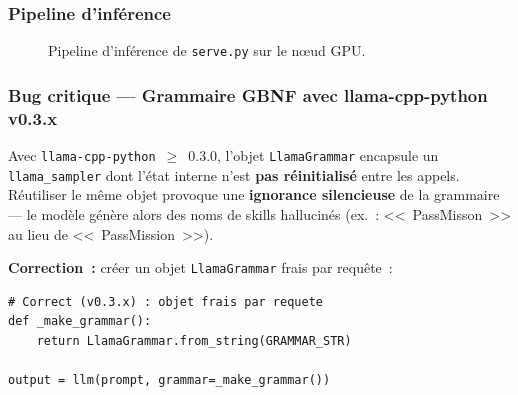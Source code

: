 \documentclass[a4paper,11pt]{article}
\newcommand{\file}[1]{\texttt{#1}}
\begin{document}
\subsubsection{Pipeline d'inférence}

\begin{figure}[H]
\centering
{}
\caption{Pipeline d'inférence de \file{serve.py} sur le nœud GPU.}
\label{fig:serve-pipeline}
\end{figure}

\subsubsection{Bug critique --- Grammaire GBNF avec llama-cpp-python v0.3.x}

Avec \texttt{llama-cpp-python}~$\geq$~0.3.0, l'objet \texttt{LlamaGrammar}
encapsule un \texttt{llama\_sampler} dont l'état interne n'est \textbf{pas
réinitialisé} entre les appels. Réutiliser le même objet provoque une
\textbf{ignorance silencieuse} de la grammaire --- le modèle génère alors
des noms de skills hallucinés (ex.~: <<~PassMisson~>> au lieu de
<<~PassMission~>>).

\textbf{Correction~:} créer un objet \texttt{LlamaGrammar} frais par
requête~:

\begin{lstlisting}[style=python, caption={Correction du bug grammar v0.3.x}]
# Correct (v0.3.x) : objet frais par requete
def _make_grammar():
    return LlamaGrammar.from_string(GRAMMAR_STR)

output = llm(prompt, grammar=_make_grammar())
\end{lstlisting}
\end{document}
